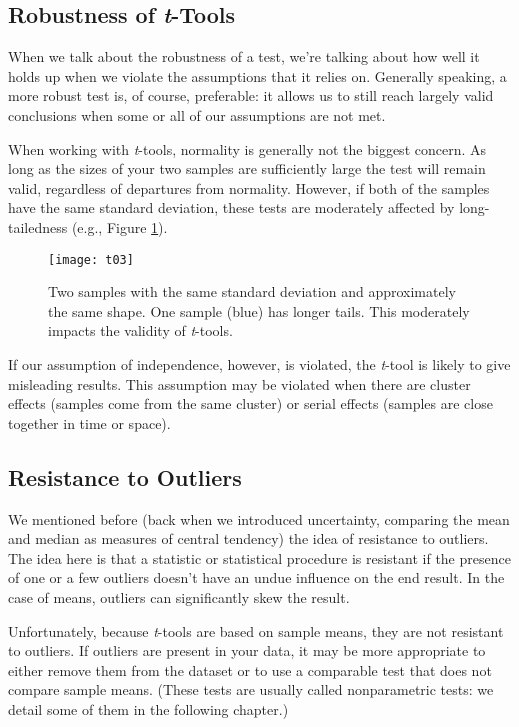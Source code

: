 \subsection{Robustness of \textit{t}-Tools}

When we talk about the robustness of a test, we're talking about how well it holds up when we violate the assumptions that it relies on. Generally speaking, a more robust test is, of course, preferable: it allows us to still reach largely valid conclusions when some or all of our assumptions are not met.

When working with \textit{t}-tools, normality is generally not the biggest concern. As long as the sizes of your two samples are sufficiently large the test will remain valid, regardless of departures from normality. However, if both of the samples have the same standard deviation, these tests are moderately affected by long-tailedness (e.g., Figure \ref{fig:t04}).

\begin{figure}[htp]
\texttt{[image: t03]}
\caption{Two samples with the same standard deviation and approximately the same shape. One sample (blue) has longer tails. This moderately impacts the validity of \textit{t}-tools.}
\label{fig:t04}
\end{figure} 

If our assumption of independence, however, is violated, the \textit{t}-tool is likely to give misleading results. This assumption may be violated when there are cluster effects (samples come from the same cluster) or serial effects (samples are close together in time or space). 

\subsection{Resistance to Outliers}

We mentioned before (back when we introduced uncertainty, comparing the mean and median as measures of central tendency) the idea of resistance to outliers. The idea here is that a statistic or statistical procedure is resistant if the presence of one or a few outliers doesn't have an undue influence on the end result. In the case of means, outliers can significantly skew the result.

Unfortunately, because \textit{t}-tools are based on sample means, they are not resistant to outliers. If outliers are present in your data, it may be more appropriate to either remove them from the dataset or to use a comparable test that does not compare sample means. (These tests are usually called nonparametric tests: we detail some of them in the following chapter.)

